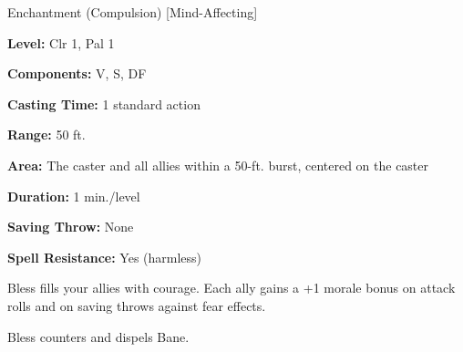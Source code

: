 
Enchantment (Compulsion) [Mind-Affecting]

\textbf{Level:} Clr 1, Pal 1

\textbf{Components:} V, S, DF

\textbf{Casting Time:} 1 standard action

\textbf{Range:} 50 ft.

\textbf{Area:} The caster and all allies within a 50-ft. burst, centered on the 
caster

\textbf{Duration:} 1 min./level

\textbf{Saving Throw:} None

\textbf{Spell Resistance:} Yes (harmless)

Bless fills your allies with courage. Each ally gains a +1 morale bonus 
on attack rolls and on saving throws against fear effects.

Bless counters and dispels Bane.

